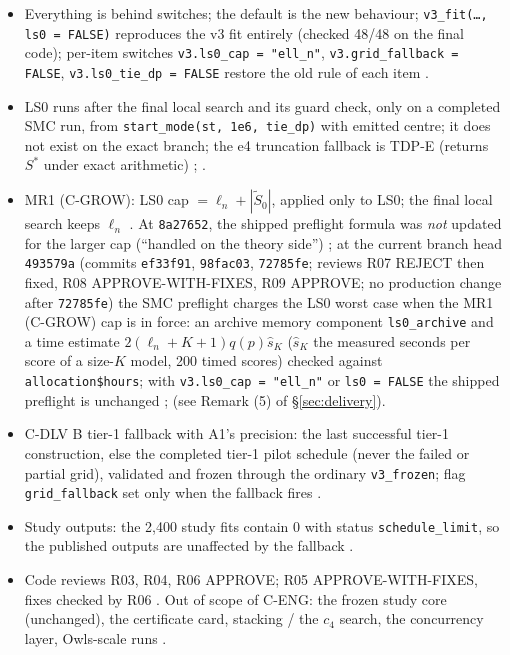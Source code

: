\begin{itemize}
\item Everything is behind switches; the default is the new behaviour; \texttt{v3\_fit(\ldots, ls0 = FALSE)} reproduces the v3 fit entirely (checked 48/48 on the final code); per-item switches \texttt{v3.ls0\_cap = "ell\_n"}, \texttt{v3.grid\_fallback = FALSE}, \texttt{v3.ls0\_tie\_dp = FALSE} restore the old rule of each item .
\item LS0 runs after the final local search and its guard check, only on a completed SMC run, from \texttt{start\_mode(st, 1e6, tie\_dp)} with emitted centre; it does not exist on the exact branch; the e4 truncation fallback is TDP-E (returns $S^*$ under exact arithmetic) ; .
\item MR1 (C-GROW): LS0 cap $=\ell_n+|\tilde S_0|$, applied only to LS0; the final local search keeps $\ell_n$ . At \texttt{8a27652}, the shipped preflight formula was \emph{not} updated for the larger cap (``handled on the theory side'') ; at the current branch head \texttt{493579a} (commits \texttt{ef33f91}, \texttt{98fac03}, \texttt{72785fe}; reviews R07 REJECT then fixed, R08 APPROVE-WITH-FIXES, R09 APPROVE; no production change after \texttt{72785fe}) the SMC preflight charges the LS0 worst case when the MR1 (C-GROW) cap is in force: an archive memory component \texttt{ls0\_archive} and a time estimate $2(\ell_n+K+1)q(p)\hat s_K$ ($\hat s_K$ the measured seconds per score of a size-$K$ model, 200 timed scores) checked against \texttt{allocation\$hours}; with \texttt{v3.ls0\_cap = "ell\_n"} or \texttt{ls0 = FALSE} the shipped preflight is unchanged ;  (see Remark (5) of §\ref{sec:delivery}).
\item C-DLV B tier-1 fallback with A1's precision: the last successful tier-1 construction, else the completed tier-1 pilot schedule (never the failed or partial grid), validated and frozen through the ordinary \texttt{v3\_frozen}; flag \texttt{grid\_fallback} set only when the fallback fires .
\item Study outputs: the 2,400 study fits contain 0 with status \texttt{schedule\_limit}, so the published outputs are unaffected by the fallback .
\item Code reviews R03, R04, R06 APPROVE; R05 APPROVE-WITH-FIXES, fixes checked by R06 . Out of scope of C-ENG: the frozen study core (unchanged), the certificate card, stacking / the $c_4$ search, the concurrency layer, Owls-scale runs .
\end{itemize}

